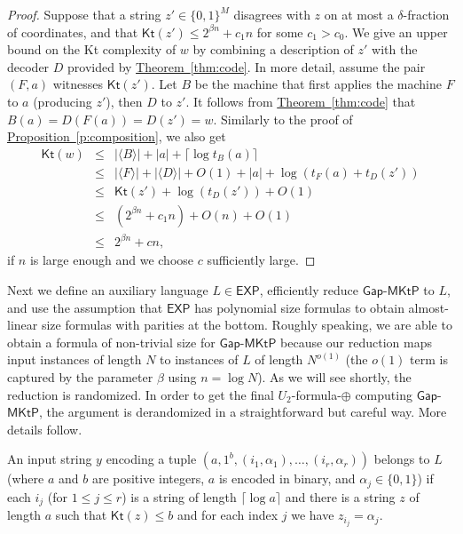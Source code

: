 \documentclass[11pt]{article}
\numberwithin{equation}{section}
\theoremstyle{definition}
\theoremstyle{plain}
\newcommand{\expref}[2]{\hyperref[#2]{#1~\ref{#2}}}
\newcommand{\gapmktp}{\mathsf{Gap}$-$\mathsf{MKtP}}
\newcommand{\Kt}{\mathsf{Kt}}
\begin{document}
\begin{proof}
  Suppose that a string $z' \in \{0,1\}^M$ disagrees with $z$ on at most a $\delta$-fraction of coordinates, and that $\Kt(z') \leq 2^{\beta n} + c_1 n$ for some $c_1 > c_0$. %
We give an upper bound on %
the Kt complexity of $w$ by combining a description of $z'$ with the decoder $D$ provided by \expref{Theorem}{thm:code}. In more detail, assume the pair $(F,a)$ witnesses $\Kt(z')$. Let $B$ be the machine that first applies the machine $F$ to $a$ (producing $z'$), then $D$ to $z'$. It follows from \expref{Theorem}{thm:code} that $B(a) = D(F(a)) = D(z') = w$. Similarly to the proof of \expref{Proposition}{p:composition}, we also get
\begin{eqnarray}
\Kt(w) & \leq & |\langle B \rangle | + |a| + \lceil \log t_B(a) \rceil \nonumber \\
& \leq & |\langle F \rangle | + |\langle D \rangle | + O(1) + |a| + \log (t_F(a) + t_D(z')) \nonumber \\
& \leq & \Kt(z') + \log (t_D(z')) + O(1) \nonumber \\
& \leq & (2^{\beta n} + c_1 n) + O(n) + O(1) \nonumber \\
& \leq & 2^{\beta n} + cn, \nonumber 
\end{eqnarray}
if $n$ is large enough and we choose $c$ sufficiently large.
\end{proof}


Next we define an auxiliary language $L \in \mathsf{EXP}$, efficiently reduce $\gapmktp$ to $L$, and use the assumption that $\mathsf{EXP}$ has polynomial size formulas to obtain almost-linear size formulas with parities at the bottom. Roughly speaking, we are able to obtain a formula of non-trivial size for $\gapmktp$ because our reduction maps input instances of length $N$ to instances of $L$ of length $N^{o(1)}$ (the $o(1)$ term is captured by the parameter $\beta$ using $n = \log N$). As we will see shortly, the reduction is randomized. In order to get the final $U_2$-formula-$\oplus$ computing $\gapmktp$, the argument is derandomized in a straightforward but careful way. More details follow.
 

An input string $y$ encoding a tuple $(a, 1^b, (i_1, \alpha_1), \ldots, (i_r, \alpha_r))$ belongs to $L$ (where $a$ and $b$ are positive integers, $a$ is encoded in binary, and $\alpha_j \in \{0,1\}$) if each $i_{j}$ (for $1 \leq j \leq r$) is a string of length $\lceil \log a \rceil$ and there is a string $z$ of length $a$ such that $\Kt(z) \leq b$ and for each index $j$ we have $z_{i_j} = \alpha_j$. 
\end{document}

